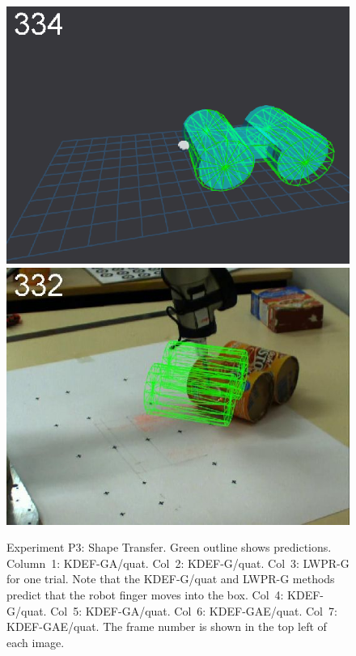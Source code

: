 \begin{figure}[t]
{\includegraphics[width=\imgCXwid]{images/C5_3exp_6_5}
\includegraphics[width=\imgCXwid]{images/C2_3exp_75_5}
}

\caption {Experiment P3: Shape Transfer. Green outline shows predictions. Column~1: KDEF-GA/quat.
  Col~2: KDEF-G/quat. Col~3: LWPR-G for one trial.  Note that the
  KDEF-G/quat and LWPR-G methods predict that the robot finger moves
  into the box.  Col~4: KDEF-G/quat. Col~5: KDEF-GA/quat. Col~6:
  KDEF-GAE/quat. Col~7: KDEF-GAE/quat. The frame number is shown in
  the top left of each image.  }
\label{fig:ExperimentStransfer}
\end{figure}


